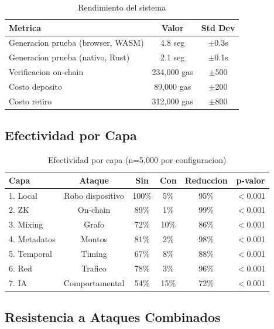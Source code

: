 \documentclass[11pt]{article}
\theoremstyle{definition}
\theoremstyle{plain}
\theoremstyle{remark}
\begin{document}
\begin{table}[H]
\centering
\caption{Rendimiento del sistema}
\label{tab:performance}
\begin{tabular}{lcc}
\toprule
\textbf{Metrica} & \textbf{Valor} & \textbf{Std Dev} \\
\midrule
Generacion prueba (browser, WASM) & 4.8 seg & $\pm$0.3s \\
Generacion prueba (nativo, Rust) & 2.1 seg & $\pm$0.1s \\
Verificacion on-chain & 234,000 gas & $\pm$500 \\
Costo deposito & 89,000 gas & $\pm$200 \\
Costo retiro & 312,000 gas & $\pm$800 \\
\bottomrule
\end{tabular}
\end{table}

\subsection{Efectividad por Capa}

\begin{table}[H]
\centering
\caption{Efectividad por capa (n=5,000 por configuracion)}
\label{tab:layers}
\begin{tabular}{lccccc}
\toprule
\textbf{Capa} & \textbf{Ataque} & \textbf{Sin} & \textbf{Con} & \textbf{Reduccion} & \textbf{p-valor} \\
\midrule
1. Local & Robo dispositivo & 100\% & 5\% & 95\% & $<$0.001 \\
2. ZK & On-chain & 89\% & 1\% & 99\% & $<$0.001 \\
3. Mixing & Grafo & 72\% & 10\% & 86\% & $<$0.001 \\
4. Metadatos & Montos & 81\% & 2\% & 98\% & $<$0.001 \\
5. Temporal & Timing & 67\% & 8\% & 88\% & $<$0.001 \\
6. Red & Trafico & 78\% & 3\% & 96\% & $<$0.001 \\
7. IA & Comportamental & 54\% & 15\% & 72\% & $<$0.001 \\
\bottomrule
\end{tabular}
\end{table}

\subsection{Resistencia a Ataques Combinados}
\end{document}
